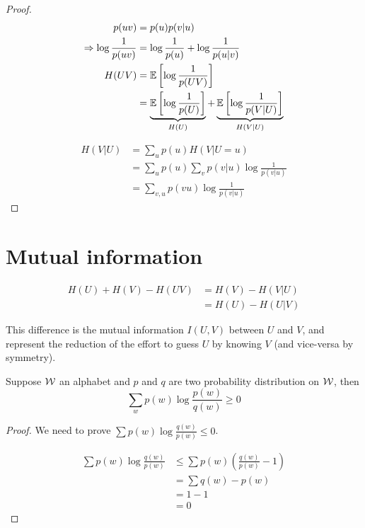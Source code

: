 \begin{proof}
    \[
        \begin{aligned}
           p(uv) &= p(u) p(v\vert u)\\
           \Rightarrow \log \frac{1}{p(uv)} &= \log \frac{1}{p(u)} + \log \frac{1}{p(u\vert v)}\\
           H(UV) &= \mathbb{E}\left[ \log \frac{1}{p(UV)} \right]\\
           &= \underbrace{\mathbb{E}\left[ \log\frac{1}{p(U)} \right]}_{H(U)} + \underbrace{\mathbb{E}\left[ \log\frac{1}{p(V\vert U)} \right]}_{H(V\vert U)}
        \end{aligned}            
    \]

    \[
        \begin{aligned}
            H(V\vert U) &= \sum_u p(u) H(V\vert U=u)\\
            &= \sum_u p(u) \sum_v p(v\vert u) \log \frac{1}{p(v\vert u)}\\
            &= \sum_{v,u} p(vu) \log \frac{1}{p(v\vert u)}
        \end{aligned}
    \]
\end{proof}

\section{Mutual information}

\begin{definition}
\[
    \begin{aligned}
        H(U) + H(V) - H(UV) &= H(V) - H(V\vert U)\\
        &= H(U) - H(U\vert V)
    \end{aligned}
\]

This difference is the mutual information $I(U,V)$ between $U$ and $V$, and represent the reduction of the effort to guess $U$ by knowing $V$ (and vice-versa by symmetry).
\end{definition}

\begin{lemma}
    Suppose $\mathcal{W}$ an alphabet and $p$ and $q$ are two probability distribution on $\mathcal{W}$, then
    \[
        \sum\limits_w p(w) \log \frac{p(w)}{q(w)}\geqslant 0
    \]
\end{lemma}
\begin{proof}
    We need to prove $\sum p(w) \log \frac{q(w)}{p(w)} \leqslant 0$.
    
    \[
        \begin{aligned}
            \sum p(w) \log \frac{q(w)}{p(w)} &\leqslant \sum p(w) (\frac{q(w)}{p(w)}-1)\\
            &= \sum q(w) - p(w)\\
            &= 1-1\\
            &= 0
        \end{aligned}            
    \]
\end{proof}

